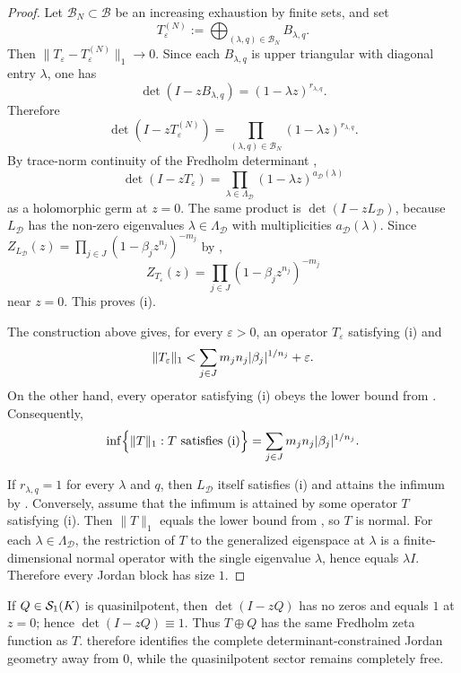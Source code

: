 \begin{proof}
  Let \(\mathcal B_N\subset \mathcal B\) be an increasing exhaustion by
  finite sets, and set
  \[
    T_\varepsilon^{(N)}
    :=\bigoplus_{(\lambda,q)\in\mathcal B_N}B_{\lambda,q}.
  \]
  Then
  \(
    \|T_\varepsilon-T_\varepsilon^{(N)}\|_1\to 0
  \).
  Since each \(B_{\lambda,q}\) is upper triangular with diagonal entry
  \(\lambda\), one has
  \[
    \det(I-zB_{\lambda,q})=(1-\lambda z)^{r_{\lambda,q}}.
  \]
  Therefore
  \[
    \det(I-zT_\varepsilon^{(N)})
    =\prod_{(\lambda,q)\in\mathcal B_N}(1-\lambda z)^{r_{\lambda,q}}.
  \]
  By trace-norm continuity of the Fredholm determinant
  \cite[Theorem~3.4]{Simon2005TraceIdeals},
  \[
    \det(I-zT_\varepsilon)
    =\prod_{\lambda\in\Lambda_{\mathcal D}}
      (1-\lambda z)^{a_{\mathcal D}(\lambda)}
  \]
  as a holomorphic germ at \(z=0\). The same product is
  \(\det(I-zL_{\mathcal D})\), because \(L_{\mathcal D}\) has the
  non-zero eigenvalues \(\lambda\in \Lambda_{\mathcal D}\) with
  multiplicities \(a_{\mathcal D}(\lambda)\). Since
  \(Z_{L_{\mathcal D}}(z)=\prod_{j\in J}(1-\beta_j z^{n_j})^{-m_j}\) by
  ,
  \[
    Z_{T_\varepsilon}(z)
    =\prod_{j\in J}(1-\beta_j z^{n_j})^{-m_j}
  \]
  near \(z=0\). This proves \textup{(i)}.

  The construction above gives, for every \(\varepsilon>0\), an operator
  \(T_\varepsilon\) satisfying \textup{(i)} and
  \[
    \|T_\varepsilon\|_1
    <\sum_{j\in J}m_jn_j\lvert \beta_j \rvert^{1/n_j}+\varepsilon.
  \]
  On the other hand, every operator satisfying \textup{(i)} obeys the
  lower bound from . Consequently,
  \[
    \inf\Bigl\{\|T\|_1:T\text{ satisfies \textup{(i)}}\Bigr\}
    =\sum_{j\in J}m_jn_j\lvert \beta_j \rvert^{1/n_j}.
  \]

  If \(r_{\lambda,q}=1\) for every \(\lambda\) and \(q\), then
  \(L_{\mathcal D}\) itself satisfies \textup{(i)} and attains the
  infimum by . Conversely, assume
  that the infimum is attained by some operator \(T\) satisfying
  \textup{(i)}. Then \(\|T\|_1\) equals the lower bound from
  , so \(T\) is normal. For each
  \(\lambda\in \Lambda_{\mathcal D}\), the restriction of \(T\) to the
  generalized eigenspace at \(\lambda\) is a finite-dimensional normal
  operator with the single eigenvalue \(\lambda\), hence equals
  \(\lambda I\). Therefore every Jordan block has size \(1\).
\end{proof}

\begin{remark}
  \label{rem:zero-spectrum-freedom}
  If \(Q\in \mathcal S_1(K)\) is quasinilpotent, then \(\det(I-zQ)\) has no
  zeros and equals \(1\) at \(z=0\); hence \(\det(I-zQ)\equiv 1\). Thus
  \(T\oplus Q\) has the same Fredholm zeta function as \(T\).
   therefore identifies the
  complete determinant-constrained Jordan geometry away from \(0\),
  while the quasinilpotent sector remains completely free.
\end{remark}

